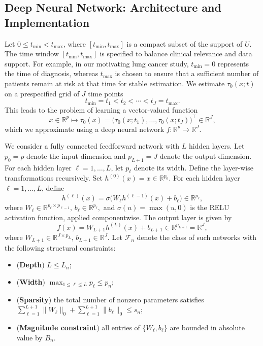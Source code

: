 \documentclass{article}
\begin{document}
\subsection{Deep Neural Network: Architecture and Implementation}
\label{DNN_architecture}

 Let $0 \le t_{\min} < t_{\max}$, where $[t_{\min}, t_{\max}]$ is a compact subset of the support of $U$. The time window $[t_{\min}, t_{\max}]$ is specified to balance clinical relevance and data support.  For example, in our motivating lung cancer study, \(t_{\min}=0\) represents the time of diagnosis, whereas \(t_{\max}\) is chosen to ensure that a sufficient number of patients remain at risk at that time for stable estimation. We estimate $\tau_0(x;t)$ on a prespecified grid of $J$ time points
\[
t_{\min}=t_1 < t_2 < \cdots < t_J=t_{\max}.
\]
This leads to the problem of learning a vector-valued function
\[
x \in \mathbb{R}^p \mapsto \tau_0(x) = \big(\tau_0(x;t_1),\ldots,\tau_0(x;t_J)\big)^\top \in \mathbb{R}^J,
\]
which we approximate using a deep neural network $f:\mathbb{R}^p \to \mathbb{R}^J$. {We consider a fully connected feedforward network with $L$ hidden layers. Let $p_0 = p$ denote the input dimension and $p_{L+1} = J$ denote the output dimension. For each hidden layer $\ell = 1,\ldots,L$, let $p_\ell$ denote its width.  Define the layer-wise transformations recursively. Set
\(
h^{(0)}(x) = x \in \mathbb{R}^{p_0}.
\)
For each hidden layer $\ell = 1,\ldots,L$, define
\[
h^{(\ell)}(x)
=
\sigma\!\big( W_\ell h^{(\ell-1)}(x) + b_\ell \big)
\in \mathbb{R}^{p_\ell},
\]
where
\(
W_\ell \in \mathbb{R}^{p_\ell \times p_{\ell-1}},
\,
b_\ell \in \mathbb{R}^{p_\ell},
\)
and $\sigma(u)=\max(u,0)$ is the RELU activation function, applied componentwise. The output layer is given by
\[
f(x)
=
W_{L+1} h^{(L)}(x) + b_{L+1}
\in \mathbb{R}^{p_{L+1}} = \mathbb{R}^J,
\]
where
\(
W_{L+1} \in \mathbb{R}^{J \times p_L},
\,
b_{L+1} \in \mathbb{R}^{J}.
\) Let $\mathcal{F}_n$ denote the class of such networks with the following structural constraints: 
\begin{itemize}
    \item[](\textbf{Depth}) $L \le L_n$;
\item[](\textbf{Width}) $\max_{1 \le \ell \le L} p_\ell \le p_n$;
  \item[](\textbf{Sparsity}) the total number of nonzero parameters satisfies
    \(
    \sum_{\ell=1}^{L+1} \|W_\ell\|_0 + \sum_{\ell=1}^{L+1} \|b_\ell\|_0 \le s_n;
    \)
  \item[](\textbf{Magnitude constraint}) all entries of $\{W_\ell, b_\ell\}$ are bounded in absolute value by $B_n$.
\end{itemize}}
\end{document}
